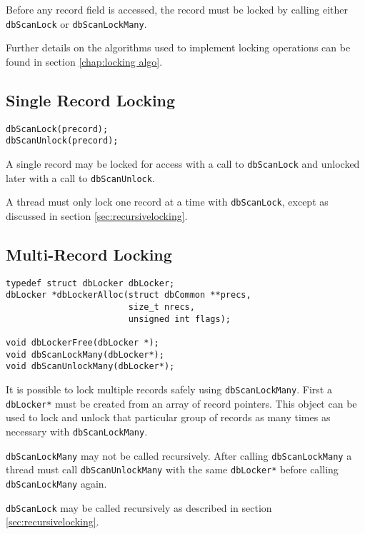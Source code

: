 Before any record field is accessed, the record must be locked by calling either \verb|dbScanLock| or \verb|dbScanLockMany|.

Further details on the algorithms used to implement locking operations can be found in section \ref{chap:locking algo}.

\subsection{Single Record Locking}

\begin{verbatim}
dbScanLock(precord);
dbScanUnlock(precord);
\end{verbatim}

A single record may be locked for access with a call to \verb|dbScanLock| and unlocked later with a call to \verb|dbScanUnlock|.

A thread must only lock one record at a time with \verb|dbScanLock|, except as discussed in section \ref{sec:recursivelocking}.

\subsection{Multi-Record Locking}

\begin{verbatim}
typedef struct dbLocker dbLocker;
dbLocker *dbLockerAlloc(struct dbCommon **precs,
                        size_t nrecs,
                        unsigned int flags);

void dbLockerFree(dbLocker *);
void dbScanLockMany(dbLocker*);
void dbScanUnlockMany(dbLocker*);
\end{verbatim}

It is possible to lock multiple records safely using \verb|dbScanLockMany|.
First a \verb|dbLocker*| must be created from an array of record pointers.
This object can be used to lock and unlock that particular group of records as many times as necessary with \verb|dbScanLockMany|.

\verb|dbScanLockMany| may not be called recursively.
After calling \verb|dbScanLockMany| a thread must call \verb|dbScanUnlockMany|
with the same \verb|dbLocker*| before calling \verb|dbScanLockMany| again.

\verb|dbScanLock| may be called recursively as described in section \ref{sec:recursivelocking}.

